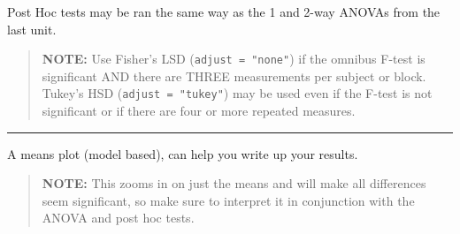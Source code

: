 \documentclass[]{article}
\newenvironment{Shaded}{\begin{snugshade}}{\end{snugshade}}
\newcommand{\KeywordTok}[1]{\textcolor[rgb]{0.13,0.29,0.53}{\textbf{#1}}}
\newcommand{\DataTypeTok}[1]{\textcolor[rgb]{0.13,0.29,0.53}{#1}}
\newcommand{\StringTok}[1]{\textcolor[rgb]{0.31,0.60,0.02}{#1}}
\newcommand{\CommentTok}[1]{\textcolor[rgb]{0.56,0.35,0.01}{\textit{#1}}}
\newcommand{\OperatorTok}[1]{\textcolor[rgb]{0.81,0.36,0.00}{\textbf{#1}}}
\newcommand{\NormalTok}[1]{#1}
\begin{document}
Post Hoc tests may be ran the same way as the 1 and 2-way ANOVAs from
the last unit.

\begin{quote}
\textbf{NOTE:} Use Fisher's LSD (\texttt{adjust\ =\ "none"}) if the
omnibus F-test is significant AND there are THREE measurements per
subject or block. Tukey's HSD (\texttt{adjust\ =\ "tukey"}) may be used
even if the F-test is not significant or if there are four or more
repeated measures.
\end{quote}

\begin{Shaded}
\end{Shaded}

\begin{Shaded}
\end{Shaded}

\begin{center}\rule{0.5\linewidth}{\linethickness}\end{center}

A means plot (model based), can help you write up your results.

\begin{quote}
\textbf{NOTE:} This zooms in on just the means and will make all
differences seem significant, so make sure to interpret it in
conjunction with the ANOVA and post hoc tests.
\end{quote}

\begin{Shaded}
\end{Shaded}
\end{document}
